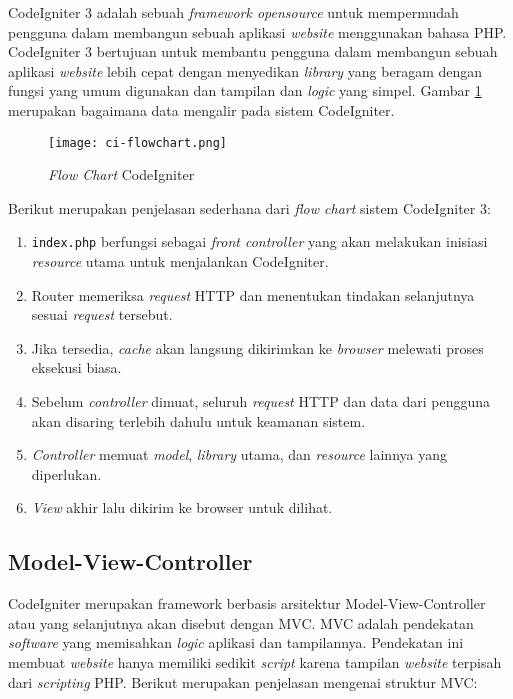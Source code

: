 CodeIgniter 3 adalah sebuah \textit{framework opensource} untuk mempermudah pengguna dalam membangun sebuah aplikasi \textit{website} menggunakan bahasa PHP. CodeIgniter 3 bertujuan untuk membantu pengguna dalam membangun sebuah aplikasi \textit{website} lebih cepat dengan menyedikan \textit{library} yang beragam dengan fungsi yang umum digunakan dan tampilan dan \textit{logic} yang simpel. Gambar \ref{fig:2:ciflowchart} merupakan bagaimana data mengalir pada sistem CodeIgniter.

\begin{figure}[H]
	\centering
	\texttt{[image: ci-flowchart.png]}
	\caption{\textit{Flow Chart} CodeIgniter}
	\label{fig:2:ciflowchart}
\end{figure}

Berikut merupakan penjelasan sederhana dari \textit{flow chart} sistem CodeIgniter 3:

\begin{enumerate}
	\item \verb|index.php| berfungsi sebagai \textit{front controller} yang akan melakukan inisiasi \textit{resource} utama untuk menjalankan CodeIgniter.
	\item Router memeriksa \textit{request} HTTP dan menentukan tindakan selanjutnya sesuai \textit{request} tersebut.
	\item Jika tersedia, \textit{cache} akan langsung dikirimkan ke \textit{browser} melewati proses eksekusi biasa.
	\item Sebelum \textit{controller} dimuat, seluruh \textit{request} HTTP dan data dari pengguna akan disaring terlebih dahulu untuk keamanan sistem.
	\item \textit{Controller} memuat \textit{model}, \textit{library} utama, dan \textit{resource} lainnya yang diperlukan.
	\item \textit{View} akhir lalu dikirim ke browser untuk dilihat.
\end{enumerate}

\subsection{Model-View-Controller}
\label{sub:2:2:modelviewcontroller}

CodeIgniter merupakan framework berbasis arsitektur Model-View-Controller atau yang selanjutnya akan disebut dengan MVC. MVC adalah pendekatan \textit{software} yang memisahkan \textit{logic} aplikasi dan tampilannya. Pendekatan ini membuat \textit{website} hanya memiliki sedikit \textit{script} karena tampilan \textit{website} terpisah dari \textit{scripting} PHP. Berikut merupakan penjelasan mengenai struktur MVC:

